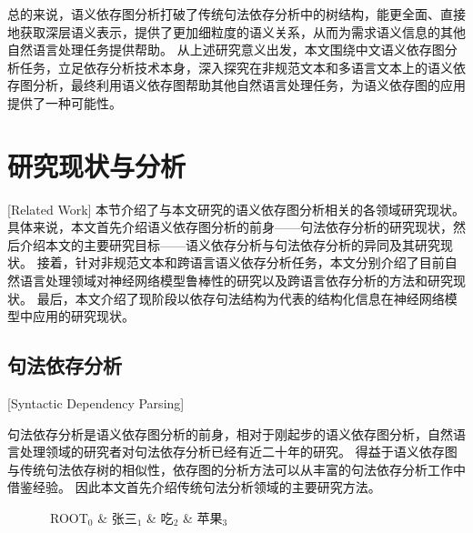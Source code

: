 总的来说，语义依存图分析打破了传统句法依存分析中的树结构，能更全面、直接地获取深层语义表示，提供了更加细粒度的语义关系，从而为需求语义信息的其他自然语言处理任务提供帮助。
从上述研究意义出发，本文围绕中文语义依存图分析任务，立足依存分析技术本身，深入探究在非规范文本和多语言文本上的语义依存图分析，最终利用语义依存图帮助其他自然语言处理任务，为语义依存图的应用提供了一种可能性。

\section{研究现状与分析}[Related Work]
本节介绍了与本文研究的语义依存图分析相关的各领域研究现状。
具体来说，本文首先介绍语义依存图分析的前身——句法依存分析的研究现状，然后介绍本文的主要研究目标——语义依存分析与句法依存分析的异同及其研究现状。
接着，针对非规范文本和跨语言语义依存分析任务，本文分别介绍了目前自然语言处理领域对神经网络模型鲁棒性的研究以及跨语言依存分析的方法和研究现状。
最后，本文介绍了现阶段以依存句法结构为代表的结构化信息在神经网络模型中应用的研究现状。

\subsection{句法依存分析}[Syntactic Dependency Parsing]
\label{sec:syntactic-dependency-parsing}

句法依存分析是语义依存图分析的前身，相对于刚起步的语义依存图分析，自然语言处理领域的研究者对句法依存分析已经有近二十年的研究。
得益于语义依存图与传统句法依存树的相似性，依存图的分析方法可以从丰富的句法依存分析工作中借鉴经验。
因此本文首先介绍传统句法分析领域的主要研究方法。

\begin{figure}[htb]
	\begin{center}
			\begin{dependency}[arc edge, arc angle=80, text only label, label style={above}]
				\begin{deptext} [row sep=0.4cm, column sep=.1cm]
					\ ROOT$_0$ \& 张三$_1$ \& 吃$_2$ \& 苹果$_3$ \\
				\end{deptext}
			\end{dependency}
	\end{center}
\end{figure}

